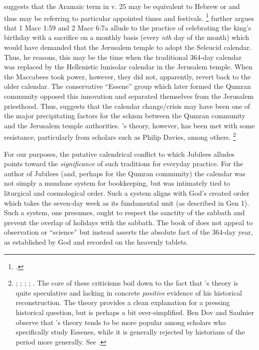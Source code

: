 \noindent
\vanderkam suggests that the Aramaic term  in v. 25 may be equivalent to Hebrew  or  and thus may be referring to particular appointed times and festivals.%
    \footnote{\cite[59--60]{vanderkam_jsj1981}.}
\vanderkam further argues that 1 Macc 1:59 and 2 Macc 6:7a allude to the practice of celebrating the king's birthday with a sacrifice on a monthly basis (every \emph{nth} day of the month) which would have demanded that the Jerusalem temple to adopt the Seleucid calendar. Thus, he reasons, this may be the time when the traditional 364-day calendar was replaced by the Hellenistic lunisolar calendar in the Jerusalem temple. When the Maccabees took power, however, they did not, apparently, revert back to the older calendar. The conservative ``Essene'' group which later formed the Qumran community opposed this innovation and separated themselves from the Jerusalem priesthood. Thus, \vanderkam suggests that the calendar change/crisis may have been one of the major precipitating factors for the schism between the Qumran community and the Jerusalem temple authorities.\autocite[52]{vanderkam_jsj1981} \vanderkam's theory, however, has been met with some resistance, particularly from scholars such as Philip Davies, among others.%
    \footnote{%
        \cite{davies_cbq1983};
        \cite{wacholder-wacholder_huca1995};
        \cite{stern_lim-etal2000};
        \cite{stern_zpe2000};
        \cite[29 n. 136]{stern2001}.
        The core of these criticisms boil down to the fact that \vanderkam's theory is quite speculative and lacking in concrete \emph{positive} evidence of his historical reconstruction. The theory provides a clean explanation for a pressing historical question, but is perhaps a bit over-simplified. Ben Dov and Saulnier observe that \vanderkam's theory tends to be more popular among scholars who specifically study Essenes, while it is generally rejected by historians of the \secondtemple period more generally. See \cite[142]{bendov-saulnier_cbr2008}.}

For our purposes, the putative calendrical conflict to which Jubilees alludes points toward the \emph{significance} of such traditions for everyday practice. For the author of Jubilees (and, perhaps for the Qumran community) the calendar was not simply a mundane system for bookkeeping, but was intimately tied to liturgical  and cosmological order. Such a system aligns with God's created order which takes the seven-day week as its fundamental unit (as described in Gen 1). Such a system, one presumes, ought to respect the sanctity of the sabbath and prevent the overlap of holidays with the sabbath. The book of \jub does not appeal to observation or ``science'' but instead asserts the absolute fact of the 364-day year, as established by God and recorded on the heavenly tablets. 

